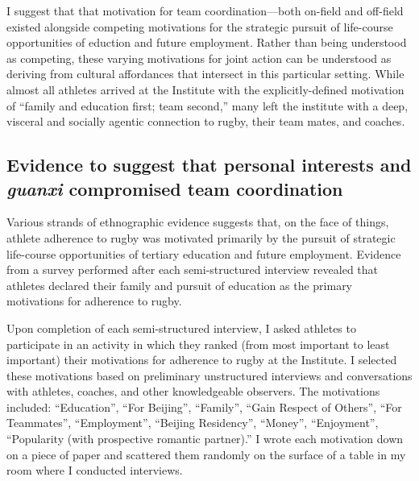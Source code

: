 \begin{CJK}{UTF8}{gbsn}
I suggest that that motivation for team coordination---both on-field and off-field existed alongside competing motivations for the strategic pursuit of life-course opportunities of eduction and future employment.  Rather than being understood as competing, these varying motivations for joint action can be understood as deriving from cultural affordances that intersect in this particular setting.  While almost all athletes arrived at the Institute with the explicitly-defined motivation of ``family and education first; team second,'' many left the institute with a deep, visceral and socially agentic connection to rugby, their team mates, and coaches.



\subsection{Evidence to suggest that personal interests and \textit{guanxi} compromised team coordination}

Various strands of ethnographic evidence suggests that, on the face of things, athlete adherence to rugby was motivated primarily by the pursuit of strategic life-course opportunities of tertiary education and future employment.  Evidence from a survey performed after each semi-structured interview revealed that athletes declared their family and pursuit of education as the primary motivations for adherence to rugby.

Upon completion of each semi-structured interview, I asked athletes to participate in an activity in which they ranked (from most important to least important) their motivations for adherence to rugby at the Institute.  I selected these motivations based on preliminary unstructured interviews and conversations with athletes, coaches, and other knowledgeable observers.  The motivations included: ``Education'', ``For Beijing'', ``Family'', ``Gain Respect of Others'', ``For Teammates'', ``Employment'', ``Beijing Residency'', ``Money'', ``Enjoyment'', ``Popularity (with prospective romantic partner).'' I wrote each motivation down on a piece of paper and scattered them randomly on the surface of a table in my room where I conducted interviews.


\end{CJK}

